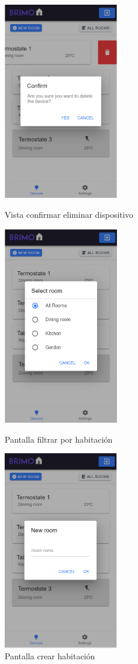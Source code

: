 \begin{figure}[!htb]
\includegraphics[width=2.00in]{images/screens/confirm_delete_screen.PNG}
\caption{Vista confirmar eliminar dispositivo}
\label{fig:pantalla_confirmar_eliminar}
\endminipage\hfill
{}
\includegraphics[width=2.00in]{images/screens/filter_screen.PNG}
\caption{Pantalla filtrar por habitación}
\label{fig:pantalla_filtrar}
\endminipage\hfill
{}%
\includegraphics[width=2.00in]{images/screens/new_room.PNG}
\caption{Pantalla crear habitación}
\label{fig:pantalla_nueva_habitacion}
\endminipage
\end{figure}

